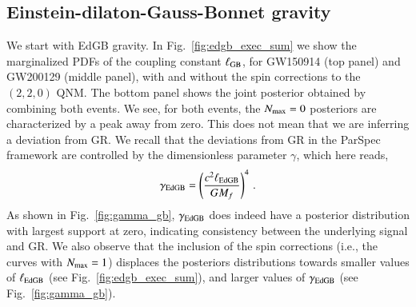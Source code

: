 \documentclass[twocolumn,
               prd,
               aps,
               superscriptaddress,
               tightenlines,
               nofootinbib,
               eqsecnum,
               amsfonts,
               amsmath,
               longbibliography]{revtex4-1}
\newcommand{\hs}[1]{{\textcolor{TealBlue}{{#1}}}}
\begin{document}



\subsection{Einstein-dilaton-Gauss-Bonnet gravity}
\label{sec:results_edgb}

We start with EdGB gravity.
%
In Fig.~\ref{fig:edgb_exec_sum} we show the marginalized PDFs of the
coupling constant $\ell_{\rm GB}$, for GW150914 (top panel) and GW200129
(middle panel), with and without the spin corrections to the $(2,2,0)$ QNM.
%
The bottom panel shows the joint posterior obtained by combining both events.
%
We see, for both events, the $N_{\rm max} = 0$ posteriors are
characterized by a peak away from zero.
%
This does not mean that we are inferring a deviation from GR.
%
We recall that the deviations from GR in the ParSpec framework are controlled
by the dimensionless parameter $\gamma$, which here reads,
%
\begin{equation}
    \gamma_{\rm EdGB} = \left(\frac{c^2 \ell_{\rm EdGB}}{ G M_{f}}\right)^4\,.
    \label{eq:def_gamma_gb}
\end{equation}
%
As shown in Fig.~\ref{fig:gamma_gb}, $\gamma_{\rm EdGB}$ does indeed have a posterior
distribution with largest support at zero, indicating consistency between
the underlying signal and GR.
%
We also observe that the inclusion of the spin corrections (i.e., the curves with $N_{\rm max} = 1$)
displaces the posteriors distributions towards smaller values of $\ell_{\rm EdGB}$ (see Fig.~\ref{fig:edgb_exec_sum}),
and larger values of $\gamma_{\rm EdGB}$ (see Fig.~\ref{fig:gamma_gb}).
\end{document}
